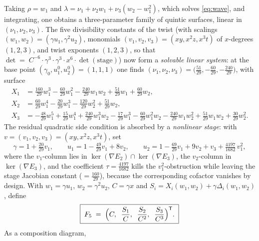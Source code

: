 \documentclass[11pt]{article}
\numberwithin{equation}{section}
\theoremstyle{plain}
\theoremstyle{definition}
\theoremstyle{remark}
\begin{document}
Taking $\rho=w_1$ and
$\lambda=\nu_1+\nu_2w_1+\nu_3(w_2-w_1^2)$, which solves \eqref{eq:wave}, and
integrating, one obtains a three-parameter family of quintic surfaces, linear
in $(\nu_1,\nu_2,\nu_3)$.
The five divisibility constants of the twist (with scalings
$(w_1,w_2)=(\gamma u_1,\gamma^2u_2)$, monomials $(v_1,v_2,v_3)=(xy,x^2z,x^3t)$
of $x$-degrees $(1,2,3)$, and twist exponents $(1,2,3)$, so that
$\det=\;C^{-6}\cdot\gamma^3\cdot\gamma^3\cdot x^6\cdot\det(\text{stage})$)
now form a \emph{solvable linear system}: at the base point
$(\gamma_0,u_1^0,u_2^0)=(1,1,1)$ one finds
$(\nu_1,\nu_2,\nu_3)=\bigl(\tfrac{51}{29},-\tfrac{60}{29},-\tfrac{240}{29}\bigr)$,
with surface
\begin{align*}
X_1&=\tfrac{160}{29}w_1^3-\tfrac{60}{29}w_1^2-\tfrac{240}{29}w_1w_2+\tfrac{51}{29}w_1+\tfrac{60}{29}w_2,\\
X_2&=\tfrac{60}{29}w_1^4-\tfrac{20}{29}w_1^3-\tfrac{120}{29}w_2^2+\tfrac{51}{29}w_2,\\
X_3&=-\tfrac{48}{29}w_1^5+\tfrac{15}{29}w_1^4+\tfrac{240}{29}w_1^3w_2-\tfrac{17}{29}w_1^3-\tfrac{60}{29}w_1^2w_2-\tfrac{240}{29}w_1w_2^2+\tfrac{51}{29}w_1w_2+\tfrac{30}{29}w_2^2 .
\end{align*}
The residual quadratic side condition is absorbed by a \emph{nonlinear
stage}: with $v=(v_1,v_2,v_3)=(xy,x^2z,x^3t)$, set
\[
\gamma=1+\tfrac{20}{29}v_1,\qquad
u_1=1-\tfrac{49}{29}v_1+8v_2,\qquad
u_2=1-\tfrac{69}{29}v_1+9v_2+v_3+\tfrac{4197}{1682}\,v_1^2 ,
\]
where the $v_1$-column lies in $\ker(\nabla E_2)\cap\ker(\nabla E_3)$, the
$v_2$-column in $\ker(\nabla E_3)$, and the coefficient $\tau=\tfrac{4197}{1682}$
kills the $v_1^2$-obstruction while leaving the stage Jacobian constant
($=\tfrac{160}{29}$), because the corresponding cofactor vanishes by design.
With $w_1=\gamma u_1$, $w_2=\gamma^2u_2$, $C=\gamma x$ and
$S_i=X_i(w_1,w_2)+\gamma\Delta_i(w_1,w_2)$, define
\[
\boxed{\;F_5\;=\;\Bigl(C,\;\;\frac{S_1}{C},\;\;\frac{S_2}{C^2},\;\;\frac{S_3}{C^3}\Bigr)^{\mathsf T}.\;}
\]
As a composition diagram,
\end{document}
